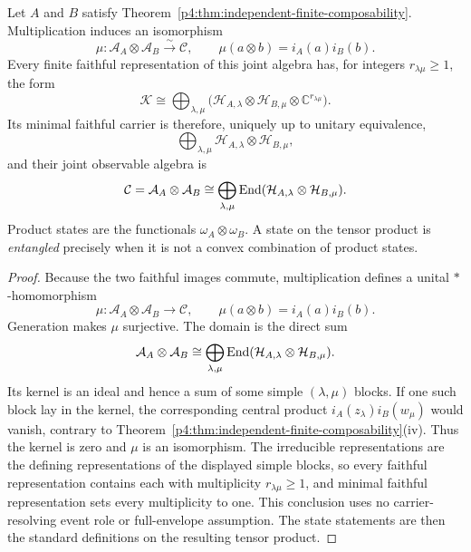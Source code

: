 \documentclass[12pt,a4paper]{article}
\begin{document}
\begin{theorem}
\label{p4:thm:tensor-product}
Let \(A\) and \(B\) satisfy
Theorem~\ref{p4:thm:independent-finite-composability}.  Multiplication
induces an isomorphism
\[
\mu:\mathcal A_A\otimes\mathcal A_B
\overset{\sim}{\longrightarrow}\mathcal C,
\qquad
\mu(a\otimes b)=i_A(a)i_B(b).
\]
Every finite faithful representation of this joint algebra has, for integers
\(r_{\lambda\mu}\ge1\), the form
\[
\mathcal K\cong
\bigoplus_{\lambda,\mu}
\bigl(\mathcal H_{A,\lambda}\otimes
\mathcal H_{B,\mu}\otimes\mathbb C^{r_{\lambda\mu}}\bigr).
\]
Its minimal faithful carrier is therefore, uniquely up to unitary
equivalence,
\begin{equation}
\label{p4:eq:tensor-product-carrier}
\bigoplus_{\lambda,\mu}
\mathcal H_{A,\lambda}\otimes\mathcal H_{B,\mu},
\end{equation}
and their joint observable algebra is
\begin{equation}
\label{p4:eq:tensor-product}
\mathcal C=\mathcal A_A\otimes\mathcal A_B
\cong\bigoplus_{\lambda,\mu}
\operatorname{End}(\mathcal H_{A,\lambda}\otimes\mathcal H_{B,\mu}).
\end{equation}
Product states are the functionals \(\omega_A\otimes\omega_B\).  A state on
the tensor product is \emph{entangled} precisely when it is not a convex
combination of product states.
\end{theorem}

\begin{proof}
Because the two faithful images commute, multiplication defines a unital
\(*\)-homomorphism
\[
\mu:\mathcal A_A\otimes\mathcal A_B\longrightarrow\mathcal C,
\qquad
\mu(a\otimes b)=i_A(a)i_B(b).
\]
Generation makes \(\mu\) surjective.  The domain is the direct sum
\[
\mathcal A_A\otimes\mathcal A_B
\cong\bigoplus_{\lambda,\mu}
\operatorname{End}(\mathcal H_{A,\lambda}\otimes\mathcal H_{B,\mu}).
\]
Its kernel is an ideal and hence a sum of some simple
\((\lambda,\mu)\) blocks.  If one such block lay in the kernel, the
corresponding central product
\(i_A(z_\lambda)i_B(w_\mu)\) would vanish, contrary to
Theorem~\ref{p4:thm:independent-finite-composability}(iv).  Thus the kernel
is zero and \(\mu\) is an isomorphism.  The irreducible representations are
the defining representations of the displayed simple blocks, so every
faithful representation contains each with multiplicity
\(r_{\lambda\mu}\ge1\), and minimal faithful representation sets every
multiplicity to one.  This conclusion uses no carrier-resolving event role or
full-envelope assumption.  The state statements are then the standard
definitions on the resulting tensor product.
\end{proof}
\end{document}
